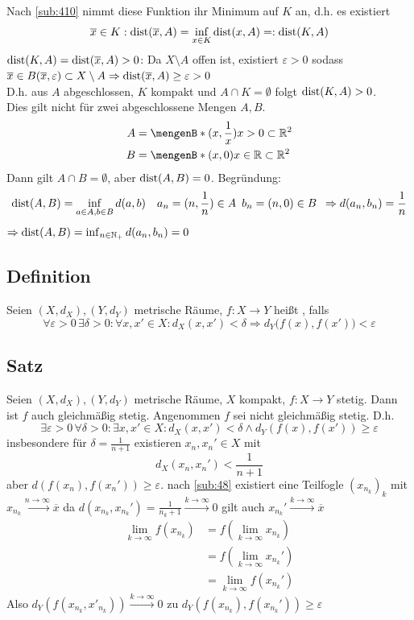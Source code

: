 Nach \ref{sub:410} nimmt diese Funktion ihr Minimum auf $K$ an, d.h. es existiert 
\[
	\overline{x} \in K : \operatorname{dist} (\overline{x} , A) = \inf_{x \in K} \operatorname{dist} (x,A)  =: \operatorname{dist}(K,A)
\]
$\operatorname{dist} (K,A)= \operatorname{dist} (\overline{x} , A) > 0 $: Da $X \setminus A$ offen ist, existiert $\varepsilon >0 $ sodass 
$\overline{x}  \in B(\overline{x}, \varepsilon )  \subset X \setminus A \Rightarrow \operatorname{dist}(\overline{x} , A) \ge \varepsilon >0$\\
D.h. aus  $A$ abgeschlossen, $K$ kompakt und $A \cap K = \emptyset$ folgt $\operatorname{dist} (K,A) >0$. \\
Dies gilt nicht für zwei abgeschlossene Mengen $A,B$.
\begin{align*}
	A &= \set[(x, \frac{1}{x} )]{x >0} \subset \mathds{R}^2 \\
	B &= \set[(x,0)]{x \in \mathds{R}} \subset \mathds{R}^2 
\end{align*}
Dann gilt $A \cap B = \emptyset$, aber $\operatorname{dist} (A,B) = 0$. Begründung:
\[
	\operatorname{dist} (A,B) = \inf_{a \in A, b \in B} d(a,b) \quad a_n = (n, \frac{1}{n} ) \in A \enspace b_n = (n,0) \in B \enspace \Rightarrow d(a_n, b_n) = \frac{1}{n} 
\]
$\Rightarrow \operatorname{dist}(A,B) = \inf_{n \in \mathbb{N}_+} d(a_n, b_n) =0$

\subsection[Definition: Gleichmäßige Stetigkeit in metrischen Räumen]{Definition} %
\label{sub:412}
Seien $(X,d_X), (Y,d_Y)$ metrische Räume, $f : X \to Y$ heißt , falls
\[
	\forall \varepsilon >0 \, \exists \delta >0 : \forall x,x' \in X : d_X (x,x' ) < \delta \Rightarrow d_Y\big(f(x), f(x')\big) < \varepsilon
\] 

\subsection[Satz: Ein $f$ stetig mit kompaktem Definitionsbereich ist gleichmäßig stetig]{Satz} %
\label{sub:413}
Seien $(X,d_X), (Y,d_Y)$ metrische Räume, $X$ kompakt, $f : X \to Y$ stetig. Dann ist $f$ auch gleichmäßig stetig.
Angenommen $f$ sei nicht gleichmäßig stetig. D.h. 
\[
	\exists \varepsilon >0 \, \forall \delta  >0 : \exists x,x' \in X : d_X(x,x') < \delta \wedge d_Y (f(x), f(x')) \ge \varepsilon
\]
insbesondere für $\delta = \frac{1}{n+1}$ existieren $x_n, x_n' \in X$ mit 
\[
	d_X(x_n, x_n') < \frac{1}{n+1} 
\]
aber $d(f(x_n), f(x_n')) \ge \varepsilon$. nach \ref{sub:48} existiert eine Teilfogle $(x_{n_k})_{k}$ mit $x_{n_k} \xrightarrow{n \to \infty} \overline{x} $ da 
$d(x_{n_k}, x_{n_k}') = \frac{1}{n_k +1} \xrightarrow{k \to \infty} 0 $ gilt auch $x_{n_k}' \xrightarrow{k \to \infty} \overline{x} $
\begin{align*}
	\lim_{ k \to \infty} f(x_{n_k}) &= f( \lim_{ k \to \infty} x_{n_k}) \\
	&= f( \lim_{ k \to \infty} x_{n_k}') \\
	&= \lim_{ k \to \infty} f (x_{n_k}')
\end{align*}
Also $d_Y(f(x_{n_k}, x'_{n_k})) \xrightarrow{k \to \infty} 0$ \enspace \light zu $d_Y( f(x_{n_k}), f( x_{n_k}') ) \ge \varepsilon$ \bewende
\newpage
